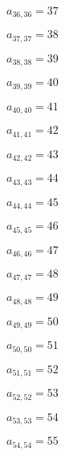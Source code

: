 \documentclass[a4paper,12pt]{article}
\begin{document}
$a _{ 36, 36 } = 37$

$a _{ 37, 37 } = 38$

$a _{ 38, 38 } = 39$

$a _{ 39, 39 } = 40$

$a _{ 40, 40 } = 41$

$a _{ 41, 41 } = 42$

$a _{ 42, 42 } = 43$

$a _{ 43, 43 } = 44$

$a _{ 44, 44 } = 45$

$a _{ 45, 45 } = 46$

$a _{ 46, 46 } = 47$

$a _{ 47, 47 } = 48$

$a _{ 48, 48 } = 49$

$a _{ 49, 49 } = 50$

$a _{ 50, 50 } = 51$

$a _{ 51, 51 } = 52$

$a _{ 52, 52 } = 53$

$a _{ 53, 53 } = 54$

$a _{ 54, 54 } = 55$
\end{document}
